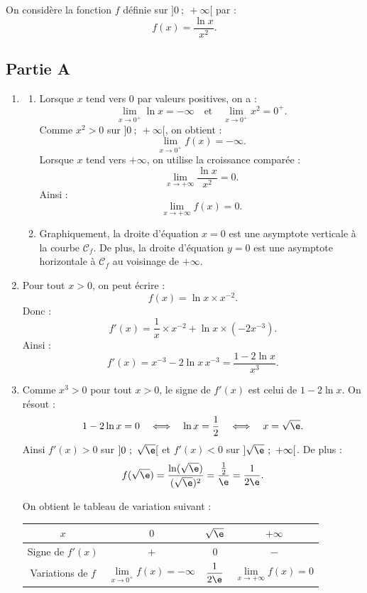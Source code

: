 On considère la fonction $f$ définie sur $]0~;~+\infty[$ par :
\[
f(x)=\dfrac{\ln x}{x^2}.
\]

\subsection*{Partie A}

\begin{enumerate}
	\item \begin{enumerate}
			\item Lorsque $x$ tend vers $0$ par valeurs positives, on a :
			\[
			\lim\limits_{x\to 0^+}\ln x=-\infty
			\quad\text{et}\quad
			\lim\limits_{x\to 0^+}x^2=0^+.
			\]
			Comme $x^2>0$ sur $]0~;~+\infty[$, on obtient :
			\[
			\lim\limits_{x\to 0^+} f(x)=-\infty.
			\]
			Lorsque $x$ tend vers $+\infty$, on utilise la croissance comparée :
			\[
			\lim\limits_{x\to +\infty}\dfrac{\ln x}{x^2}=0.
			\]
			Ainsi :
			\[
			\lim\limits_{x\to +\infty} f(x)=0.
			\]

		\item Graphiquement, la droite d'équation $x=0$ est une asymptote verticale à la courbe $\mathcal C_f$.
		De plus, la droite d'équation $y=0$ est une asymptote horizontale à $\mathcal C_f$ au voisinage de $+\infty$.
	\end{enumerate}

	\item Pour tout $x>0$, on peut écrire :
	\[
	f(x)=\ln x\times x^{-2}.
	\]
	Donc :
	\[
	f'(x)=\dfrac1x\times x^{-2}+\ln x\times\left(-2x^{-3}\right).
	\]
	Ainsi :
	\[
	f'(x)=x^{-3}-2\ln x\,x^{-3}=\dfrac{1-2\ln x}{x^3}.
	\]

	\item Comme $x^3>0$ pour tout $x>0$, le signe de $f'(x)$ est celui de $1-2\ln x$.
	On résout :
	\[
	1-2\ln x=0
	\quad\Longleftrightarrow\quad
	\ln x=\dfrac12
	\quad\Longleftrightarrow\quad
	x=\sqrt{\e}.
	\]
	Ainsi $f'(x)>0$ sur $]0~;~\sqrt\e[$ et $f'(x)<0$ sur $]\sqrt\e~;~+\infty[$.
	De plus :
	\[
	f(\sqrt\e)=\dfrac{\ln(\sqrt\e)}{(\sqrt\e)^2}
	=\dfrac{\frac12}{\e}
	=\dfrac{1}{2\e}.
	\]

		On obtient le tableau de variation suivant :

		\begin{center}
		\renewcommand{\arraystretch}{1.4}
		\begin{tabular}{|c|ccc|}
		\hline
		$x$ & $0$ & $\sqrt\e$ & $+\infty$ \\
		\hline
		Signe de $f'(x)$ & $+$ & $0$ & $-$ \\
		\hline
		Variations de $f$ &
		$\lim\limits_{x\to 0^+} f(x)=-\infty$
		& $\dfrac{1}{2\e}$
		& $\lim\limits_{x\to +\infty} f(x)=0$ \\
		\hline
		\end{tabular}
		\end{center}


\end{enumerate}
